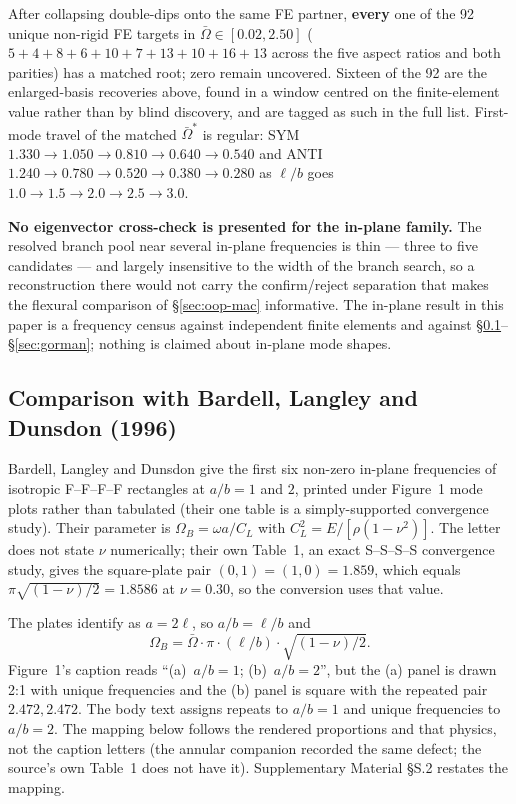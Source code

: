 \documentclass[11pt]{article}
\begin{document}
After collapsing double-dips onto the same FE partner, \textbf{every} one
of the 92 unique non-rigid FE targets in $\bar\Omega\in[0.02,2.50]$
($5+4+8+6+10+7+13+10+16+13$ across the five aspect ratios and both
parities) has a matched root; zero remain uncovered. Sixteen of the 92 are
the enlarged-basis recoveries above, found in a window centred on the
finite-element value rather than by blind discovery, and are tagged as such
in the full list. First-mode travel of the
matched $\bar\Omega^{*}$ is regular: SYM
$1.330\to 1.050\to 0.810\to 0.640\to 0.540$ and ANTI
$1.240\to 0.780\to 0.520\to 0.380\to 0.280$ as $\ell/b$ goes
$1.0\to 1.5\to 2.0\to 2.5\to 3.0$.

\textbf{No eigenvector cross-check is presented for the in-plane family.}
The resolved branch pool near several in-plane frequencies is thin --- three
to five candidates --- and largely insensitive to the width of the branch
search, so a reconstruction there would not carry the confirm/reject
separation that makes the flexural comparison of \S\ref{sec:oop-mac}
informative. The in-plane result in this paper is a frequency census
against independent finite elements and against
\S\ref{sec:bardell}--\S\ref{sec:gorman}; nothing is claimed about
in-plane mode shapes.

\subsection{Comparison with Bardell, Langley and Dunsdon (1996)}\label{sec:bardell}
Bardell, Langley and Dunsdon \cite{bardell1996} give the first six
non-zero in-plane frequencies of isotropic F--F--F--F rectangles at
$a/b=1$ and $2$, printed under Figure~1 mode plots rather than tabulated
(their one table is a simply-supported convergence study). Their
parameter is $\Omega_B=\omega a/C_L$ with $C_L^2=E/[\rho(1-\nu^2)]$. The
letter does not state $\nu$ numerically; their own Table~1, an exact
S--S--S--S convergence study, gives the square-plate pair
$(0,1)=(1,0)=1.859$, which equals $\pi\sqrt{(1-\nu)/2}=1.8586$ at
$\nu=0.30$, so the conversion uses that value.

The plates identify as $a=2\ell$, so $a/b=\ell/b$ and
\begin{equation}
\Omega_B=\bar\Omega\cdot\pi\cdot(\ell/b)\cdot\sqrt{(1-\nu)/2}.
\label{eq:bardell-conv}
\end{equation}
Figure~1's caption reads ``(a)~$a/b=1$; (b)~$a/b=2$'', but the (a)
panel is drawn 2:1 with unique frequencies and the (b) panel is square
with the repeated pair $2.472,2.472$. The body text assigns repeats to
$a/b=1$ and unique frequencies to $a/b=2$. The mapping below follows the
rendered proportions and that physics, not the caption letters (the
annular companion \cite{mccune2026annular} recorded the same defect; the
source's own Table~1 does not have it). Supplementary Material \S{}S.2
restates the mapping.
\end{document}

